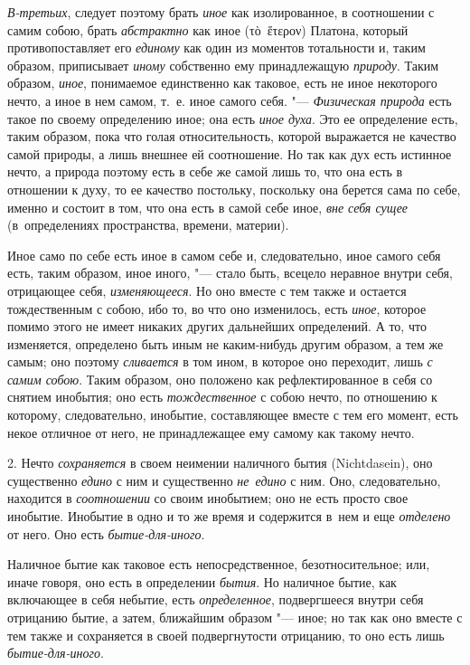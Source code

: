{\em В-третьих}, следует поэтому брать {\em иное} как изолированное,
в соотношении с самим собою, брать {\em абстрактно}
как иное (\textgreek{τὸ~ἕτερον}) Платона, который
противопоставляет его {\em единому} как один из
моментов тотальности и, таким образом, приписывает
{\em иному} собственно ему принадлежащую {\em природу}. Таким образом,
{\em иное}, понимаемое единственно как таковое, есть
не иное некоторого нечто, а иное в нем самом, т.~е. иное самого себя.
"--- {\em Физическая природа} есть такое по своему
определению иное; она есть {\em иное духа}. Это ее
определение есть, таким образом, пока что голая относительность, которой
выражается не качество самой природы, а лишь внешнее ей соотношение. Но так
как дух есть истинное нечто, а природа поэтому есть в себе же самой лишь
то, что она есть в отношении к духу, то ее качество постольку, поскольку
она берется сама по себе, именно и состоит в том, что она есть в самой себе
иное, {\em вне себя сущее} (в~определениях пространства, времени, материи).

Иное само по себе есть иное в самом себе и, следовательно, иное самого
себя есть, таким образом, иное иного, "--- стало быть, всецело неравное
внутри себя, отрицающее себя, {\em изменяющееся}. Но
оно вместе с тем также и остается тождественным с собою, ибо то, во что оно
изменилось, есть {\em иное}, которое помимо этого не
имеет никаких других дальнейших определений. А то, что изменяется,
определено быть иным не каким-нибудь другим образом, а тем же самым; оно
поэтому {\em сливается} в том ином, в которое оно
переходит, лишь {\em с самим собою}. Таким образом, оно
положено как рефлектированное в себя со снятием инобытия; оно есть
{\em тождественное} с собою нечто, по отношению к
которому, следовательно, инобытие, составляющее вместе с тем его момент,
есть некое отличное от него, не принадлежащее ему самому как такому нечто.

2. Нечто {\em сохраняется} в своем неимении наличного
бытия (Nicht\-dasein), оно существенно {\em едино} с ним
и существенно {\em не~едино} с ним. Оно, следовательно,
находится в {\em соотношении} со своим инобытием; оно не есть просто
свое инобытие. Инобытие в одно и то же время и содержится в~нем
и еще {\em отделено} от него. Оно есть {\em бытие-для-иного}.

Наличное бытие как таковое есть непосредственное, безотносительное; или,
иначе говоря, оно есть в определении {\em бытия}. Но
наличное бытие, как включающее в себя небытие, есть
{\em определенное}, подвергшееся внутри себя отрицанию
бытие, а затем, ближайшим образом "--- иное; но так как оно вместе с тем
также и сохраняется в своей подвергнутости отрицанию, то оно есть лишь
{\em бытие-для-иного}.

